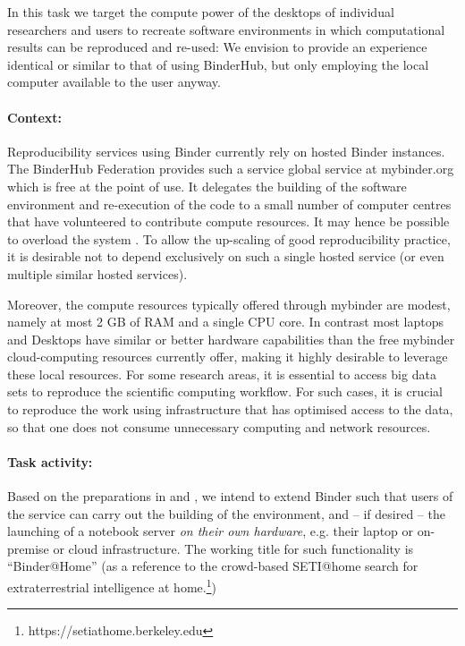 \begin{task}[
  title=Binder@Home,
  id=binder-at-home,
  lead=SRL,
  PM=7,
  partners={MP,UIO}
]
In this task we target the compute power of the desktops of individual researchers and
users to recreate software environments in which computational results can be
reproduced and re-used: We envision to provide an experience identical or similar
to that of using BinderHub, but only employing the local computer available to the user anyway.

\paragraph*{Context:} Reproducibility services using Binder currently rely on hosted Binder instances.
The BinderHub Federation provides such a service global service at mybinder.org
which is free at
the point of use. It delegates the building of the software environment and
re-execution of the code to a small number of computer centres that have
volunteered to contribute compute resources.
It may hence be possible to overload the system .
To allow the up-scaling of good reproducibility practice, it is 
desirable not to depend exclusively on such a single hosted service (or even multiple similar hosted services).

Moreover, the compute resources typically offered through mybinder are modest, namely at most 2 GB of RAM
and a single CPU core.
In contrast most laptops and Desktops have similar or better hardware capabilities than
the free mybinder cloud-computing resources currently offer, making it highly desirable to leverage these local resources.
For some research areas, it is essential to access big data sets to reproduce the scientific computing workflow.
For such cases, it is crucial to reproduce the work using infrastructure that has optimised access to the data,
so that one does not consume unnecessary computing and network resources.  

\paragraph*{Task activity:} Based on the preparations in  and
, we intend to extend Binder such that users of the service can
carry out the building of the environment, and -- if desired -- the launching of a
notebook server \emph{on their own hardware}, e.g. their laptop or on-premise or cloud infrastructure.
The working title for such
functionality is ``Binder@Home'' (as a reference to the crowd-based SETI@home search for
extraterrestrial intelligence at home.\footnote{https://setiathome.berkeley.edu})


\end{task}
